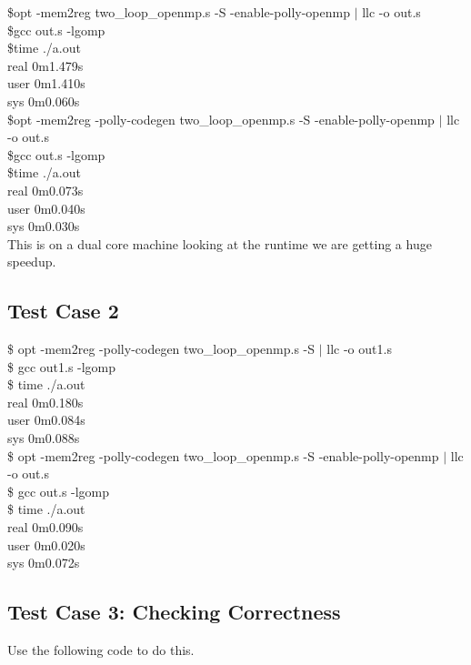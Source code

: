 \documentclass[a4paper,10pt]{article}
\begin{document}
\$opt -mem2reg  two\_loop\_openmp.s -S -enable-polly-openmp $|$ llc -o out.s\\
\$gcc out.s -lgomp\\
\$time ./a.out\\
real    0m1.479s\\
user    0m1.410s\\
sys     0m0.060s\\
\$opt -mem2reg -polly-codegen two\_loop\_openmp.s -S -enable-polly-openmp $|$ llc -o out.s\\
\$gcc out.s -lgomp\\
\$time ./a.out\\
real    0m0.073s\\
user    0m0.040s\\
sys     0m0.030s\\

This is on a dual core machine looking at the runtime we are getting a huge speedup.

\subsection{Test Case 2}

\$ opt -mem2reg -polly-codegen two\_loop\_openmp.s -S  $|$ llc -o out1.s\\
\$ gcc out1.s -lgomp\\
\$ time ./a.out\\
real    0m0.180s\\
user    0m0.084s\\
sys    0m0.088s\\
\$ opt -mem2reg -polly-codegen two\_loop\_openmp.s -S -enable-polly-openmp $|$ llc -o out.s\\
\$ gcc out.s -lgomp\\
\$ time ./a.out\\
real    0m0.090s\\
user    0m0.020s\\
sys    0m0.072s\\

\subsection{Test Case 3: Checking Correctness}

Use the following code to do this.
\end{document}
